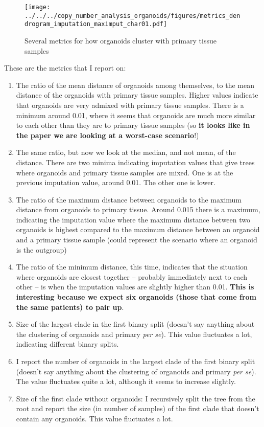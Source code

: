 \documentclass[11pt,a4paper,roman]{article}
\begin{document}
\begin{figure}[h]
\centering
\texttt{[image: ../../../copy\_number\_analysis\_organoids/figures/metrics\_dendrogram\_imputation\_maximput\_char01.pdf]}
\caption{Several metrics for how organoids cluster with primary tissue samples\label{metrics}}
\end{figure}

These are the metrics that I report on:
\begin{enumerate}
\item The ratio of the mean distance of organoids among themselves, to the mean distance of the organoids with primary tissue samples. Higher values indicate that organoids are very admixed with primary tissue samples. There is a minimum around 0.01, where it seems that organoids are much more similar to each other than they are to primary tissue samples (so \textbf{it looks like in the paper we are looking at a worst-case scenario}!)
\item The same ratio, but now we look at the median, and not mean, of the distance. There are two minima indicating imputation values that give trees where organoids and primary tissue samples are mixed. One is at the previous imputation value, around 0.01. The other one is lower.
\item The ratio of the maximum distance between organoids to the maximum distance from organoids to primary tissue. Around 0.015 there is a maximum, indicating the imputation value where the maximum distance between two organoids is highest compared to the maximum distance between an organoid and a primary tissue sample (could represent the scenario where an organoid is the outgroup)
\item The ratio of the minimum distance, this time, indicates that the situation where organoids are closest together -- probably immediately next to each other -- is when the imputation values are slightly higher than 0.01. \textbf{This is interesting because we expect six organoids (those that come from the same patients) to pair up}.
\item Size of the largest clade in the first binary split (doesn't say anything about the clustering of organoids and primary \emph{per se}). This value fluctuates a lot, indicating different binary splits.
\item I report the number of organoids in the largest clade of the first binary split  (doesn't say anything about the clustering of organoids and primary \emph{per se}). The value fluctuates quite a lot, although it seems to increase slightly.
\item Size of the first clade without organoids: I recursively split the tree from the root and report the size (in number of samples) of the first clade that doesn't contain any organoids.  This value fluctuates a lot.
\end{enumerate}
\end{document}
